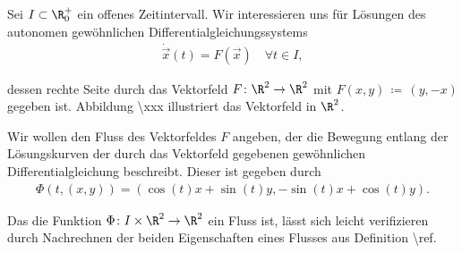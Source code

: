 \documentclass[letterpaper,10pt,english]{jupyterBook}
\begin{document}
\begin{example}{}{}



\par
Sei \(I\subset \R_0^+\) ein offenes Zeitintervall.
Wir interessieren uns für Lösungen des autonomen gewöhnlichen Differentialgleichungssystems
\begin{align*}
\dot{\vec{x}}(t) = F(\vec{x}) \quad \forall t\in I,
\end{align*}
\par
dessen rechte Seite durch das Vektorfeld \(F \colon \R^2 \rightarrow \R^2\) mit \(F(x,y) \, \coloneqq \, (y, -x)\) gegeben ist.
Abbildung \textbackslash{}xxx illustriert das Vektorfeld in \(\R^2\).

\par
Wir wollen den Fluss des Vektorfeldes \(F\) angeben, der die Bewegung entlang der Lösungskurven der durch das Vektorfeld gegebenen gewöhnlichen Differentialgleichung beschreibt.
Dieser ist gegeben durch
\begin{align*}
\Phi(t,(x,y)) = (\cos(t)x + \sin(t)y, -\sin(t)x + \cos(t)y).
\end{align*}
\par
Das die Funktion \(\Phi \colon I \times \R^2 \rightarrow \R^2\) ein Fluss ist, lässt sich leicht verifizieren durch Nachrechnen der beiden Eigenschaften eines Flusses aus Definition \textbackslash{}ref.


\end{example}
\end{document}
